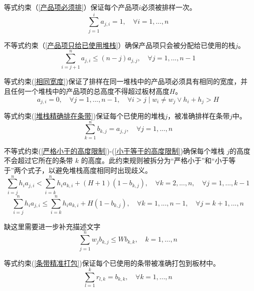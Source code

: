 \documentclass[bwprint]{gmcmthesis}
\begin{document}
等式约束（\ref{产品项必须排}）保证每个产品项$i$必须被排样一次。
\begin{equation}
    \sum_{j=1}^{i}  a_{j,i} =1,\quad \forall i=1,...,n \label{产品项必须排}
\end{equation}

不等式约束（\ref{产品项只给已使用堆栈}）确保产品项只会被分配给已使用的栈$j$。
\begin{equation}
   \sum_{i=j+1}^{n}  a_{j,i} \le (n-j)a_{j,j},\quad \forall j=1,...,n-1  \label{产品项只给已使用堆栈}
\end{equation}

等式约束(\ref{相同宽度})保证了排样在同一堆栈中的产品项必须具有相同的宽度，并且任何一个堆栈中的产品项的总高度不得超过板材高度$H$。
\begin{equation}
     a_{j,i}=0, \quad \forall j=1,...,n-1,\quad  \forall i>j \mid w_i \neq w_j \vee h_i+h_j>H \label{相同宽度}
 \end{equation}

 等式约束(\ref{堆栈精确排在条带})保证每个已使用的堆栈$j$，被准确排样在条带$j$中。
\begin{equation}
    \sum_{k=1}^{n}  b_{k,j} =a_{j,j},\quad \forall j=1,...,n  \label{堆栈精确排在条带}
\end{equation}

不等式约束(\ref{严格小于的高度限制})-(\ref{小于等于的高度限制})确保每个堆栈 $j$的高度不会超过它所在的条带 $k$ 的高度。此约束规则被拆分为“严格小于”和“小于等于”两个式子，以避免堆栈高度相同时出现歧义。
\begin{equation}
    \sum_{i=j}^{n} h_ia_{j,i}<\sum_{i=k}^n h_i a_{k,i}+(H+1)(1-b_{k,j}),\quad  \forall  k=2,...,n,\quad  \forall j=1,...,k-1 \label{严格小于的高度限制}
\end{equation}
\begin{equation}
    \sum_{i=j}^{n} h_ia_{j,i} \le \sum_{i=k}^n h_i a_{k,i}+H(1-b_{k,j}), \quad  \forall k=1,...,n-1, \quad \forall j=k+1,...,n \label{小于等于的高度限制}
\end{equation}

缺这里需要进一步补充描述文字
\begin{equation}
    \sum_{j=1}^{n} w_j b_{k,j} \le W b_{k,k}, \quad k=1,...,n \label{宽度限制}
\end{equation}

等式约束(\ref{条带精准打包})保证每个已使用的条带被准确打包到板材中。
\begin{equation}
    \sum_{l=1}^{k} r_{l,k} = b_{k,k}, \quad \forall k=1,...,n \label{条带精准打包}
\end{equation}
\end{document}
